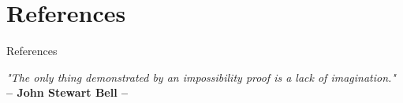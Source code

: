 \documentclass[9pt, handout, aspectratio=169]{beamer}		%
\begin{document}

\section{References}
	\begin{frame}{References}

		\begin{thebibliography}{9}
		
		\end{thebibliography}
		
		\vspace{20pt}
		\begin{small}
		\begin{center}{
		\color{gray}
			\emph{"The only thing demonstrated by an impossibility proof is a lack of imagination."} \\
			\textbf{– John Stewart Bell –} }
		\end{center}
		\end{small}
	\end{frame}

\FinalFrame
\end{document}
